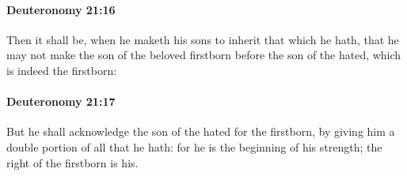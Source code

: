 		\paragraph{Deuteronomy 21:16} %
			\label{DEUTERONOMY-21-16}

			Then it shall be, when he maketh his sons to inherit that which he hath, that he may not make the son of the beloved firstborn before the son of the hated, which is indeed the firstborn:


		\paragraph{Deuteronomy 21:17} %
			\label{DEUTERONOMY-21-17}

			But he shall acknowledge the son of the hated for the firstborn, by giving him a double portion of all that he hath: for he is the beginning of his strength; the right of the firstborn is his.

